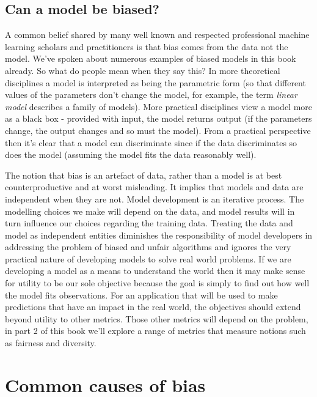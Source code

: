 \subsection{Can a model be biased?}

A common belief shared by many well known and respected professional machine learning scholars and practitioners is that bias comes from the data not the model. We've spoken about numerous examples of biased models in this book already. So what do people mean when they say this? In more theoretical disciplines a model is interpreted as being the parametric form (so that different values of the parameters don't change the model, for example, the term \emph{linear model} describes a family of models). More practical disciplines view a model more as a black box - provided with input, the model returns output (if the parameters change, the output changes and so must the model). From a practical perspective then it's clear that a model can discriminate since if the data discriminates so does the model (assuming the model fits the data reasonably well).

The notion that bias is an artefact of data, rather than a model is at best counterproductive and at worst misleading. It implies that models and data are independent when they are not. Model development is an iterative process. The modelling choices we make will depend on the data, and model results will in turn influence our choices regarding the training data. Treating the data and model as independent entities diminishes the responsibility of model developers in addressing the problem of biased and unfair algorithms and ignores the very practical nature of developing models to solve real world problems. If we are developing a model as a means to understand the world then it may make sense for utility to be our sole objective because the goal is simply to find out how well the model fits observations. For an application that will be used to make predictions that have an impact in the real world, the objectives should extend beyond utility to other metrics. Those other metrics will depend on the problem, in part 2 of this book we'll explore a range of metrics that measure notions such as fairness and diversity.

\section{Common causes of bias}

